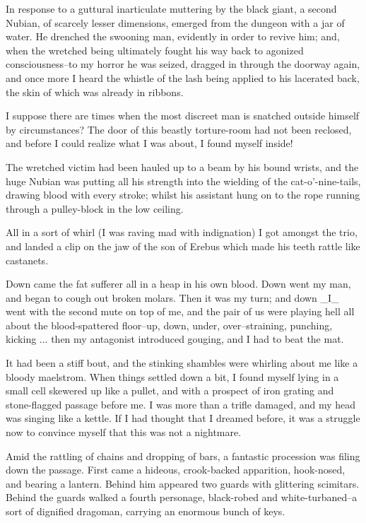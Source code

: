 In response to a guttural inarticulate muttering by the black giant, a
second Nubian, of scarcely lesser dimensions, emerged from the dungeon
with a jar of water. He drenched the swooning man, evidently in order
to revive him; and, when the wretched being ultimately fought his way
back to agonized consciousness--to my horror he was seized, dragged in
through the doorway again, and once more I heard the whistle of the
lash being applied to his lacerated back, the skin of which was
already in ribbons.

I suppose there are times when the most discreet man is snatched
outside himself by circumstances? The door of this beastly
torture-room had not been reclosed, and before I could realize what I
was about, I found myself inside!

The wretched victim had been hauled up to a beam by his bound wrists,
and the huge Nubian was putting all his strength into the wielding of
the cat-o'-nine-tails, drawing blood with every stroke; whilst his
assistant hung on to the rope running through a pulley-block in the
low ceiling.

All in a sort of whirl (I was raving mad with indignation) I got
amongst the trio, and landed a clip on the jaw of the son of Erebus
which made his teeth rattle like castanets.

Down came the fat sufferer all in a heap in his own blood. Down went
my man, and began to cough out broken molars. Then it was my turn;
and down _I_ went with the second mute on top of me, and the pair of
us were playing hell all about the blood-spattered floor--up, down,
under, over--straining, punching, kicking ... then my antagonist
introduced gouging, and I had to beat the mat.

It had been a stiff bout, and the stinking shambles were whirling
about me like a bloody maelstrom. When things settled down a bit, I
found myself lying in a small cell skewered up like a pullet, and with
a prospect of iron grating and stone-flagged passage before me. I was
more than a trifle damaged, and my head was singing like a kettle. If
I had thought that I dreamed before, it was a struggle now to convince
myself that this was not a nightmare.

Amid the rattling of chains and dropping of bars, a fantastic
procession was filing down the passage. First came a hideous,
crook-backed apparition, hook-nosed, and bearing a lantern. Behind him
appeared two guards with glittering scimitars. Behind the guards
walked a fourth personage, black-robed and white-turbaned--a sort of
dignified dragoman, carrying an enormous bunch of keys.

